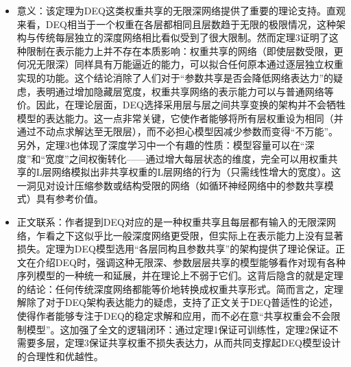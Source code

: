 \documentclass[cn,hazy,cyan,11pt,normal]{elegantnote}
\begin{document}
\begin{itemize}
        \item 意义：该定理为DEQ这类权重共享的无限深网络提供了重要的理论支持。直观来看，DEQ相当于一个权重在各层都相同且层数趋于无限的极限情况，这种架构与传统每层独立的深度网络相比看似受到了很大限制。然而定理3证明了这种限制在表示能力上并不存在本质影响：权重共享的网络（即使层数受限，更何况无限深）同样具有万能逼近的能力，可以拟合任何原本通过逐层独立权重实现的功能。这个结论消除了人们对于“参数共享是否会降低网络表达力”的疑虑，表明通过增加隐藏层宽度，权重共享网络的表示能力可以与普通网络等价。因此，在理论层面，DEQ选择采用层与层之间共享变换的架构并不会牺牲模型的表达能力。这一点非常关键，它使作者能够将所有层权重设为相同（并通过不动点求解达至无限层），而不必担心模型因减少参数而变得“不万能”。另外，定理3也体现了深度学习中一个有趣的性质：模型容量可以在“深度”和“宽度”之间权衡转化——通过增大每层状态的维度，完全可以用权重共享的L层网络模拟出非共享权重的L层网络的行为（只需线性增大的宽度）。这一洞见对设计压缩参数或结构受限的网络（如循环神经网络中的参数共享模式）具有参考价值。
        \item 正文联系：作者提到DEQ对应的是一种权重共享且每层都有输入的无限深网络，乍看之下这似乎比一般深度网络更受限，但实际上在表示能力上没有显著损失。定理为DEQ模型选用“各层同构且参数共享”的架构提供了理论保证。正文在介绍DEQ时，强调这种无限深、参数层层共享的模型能够看作对现有各种序列模型的一种统一和延展，并在理论上不弱于它们。这背后隐含的就是定理的结论：任何传统深度网络都能等价地转换成权重共享形式。简而言之，定理解除了对于DEQ架构表达能力的疑虑，支持了正文关于DEQ普适性的论述，使得作者能够专注于DEQ的稳定求解和应用，而不必在意“共享权重会不会限制模型”。这加强了全文的逻辑闭环：通过定理1保证可训练性，定理2保证不需要多层，定理3保证共享权重不损失表达力，从而共同支撑起DEQ模型设计的合理性和优越性。
    \end{itemize}
\end{document}
